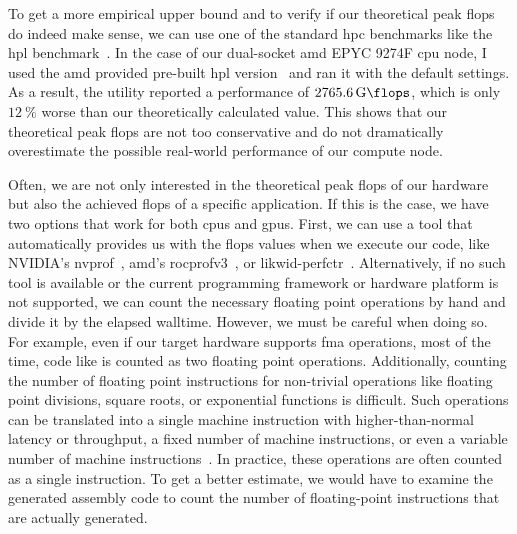 To get a more empirical upper bound and to verify if our theoretical peak \gls{flops} do indeed make sense, we can use one of the standard \gls{hpc} benchmarks like the \gls{hpl} benchmark~\cite{petitet_hpl_2018}. 
In the case of our dual-socket \gls{amd} EPYC 9274F \gls{cpu} node, I used the \gls{amd} provided pre-built \gls{hpl} version~\cite{amd_pre-built_2025} and ran it with the default settings. 
As a result, the utility reported a performance of $\SI{2765.6}{\giga\flops}$, which is only $\SI{12}{\percent}$ worse than our theoretically calculated value. 
This shows that our theoretical peak \gls{flops} are not too conservative and do not dramatically overestimate the possible real-world performance of our compute node. 

Often, we are not only interested in the theoretical peak \gls{flops} of our hardware but also the achieved \gls{flops} of a specific application.
If this is the case, we have two options that work for both \glspl{cpu} and \glspl{gpu}. 
First, we can use a tool that automatically provides us with the \gls{flops} values when we execute our code, like NVIDIA's nvprof~\cite{nvidia_corporation_cuda_2025}, \gls{amd}'s rocprofv3~\cite{amd_using_2024}, or likwid-perfctr~\cite{thomas_gruber_likwid_2023}. 
Alternatively, if no such tool is available or the current programming framework or hardware platform is not supported, we can count the necessary floating point operations by hand and divide it by the elapsed walltime. 
However, we must be careful when doing so. 
For example, even if our target hardware supports \gls{fma} operations, most of the time, code like  is counted as two floating point operations. 
Additionally, counting the number of floating point instructions for non-trivial operations like floating point divisions, square roots, or exponential functions is difficult. 
Such operations can be translated into a single machine instruction with higher-than-normal latency or throughput, a fixed number of machine instructions, or even a variable number of machine instructions~\cite{dolbeau_theoretical_2018}. 
In practice, these operations are often counted as a single instruction. 
To get a better estimate, we would have to examine the generated assembly code to count the number of floating-point instructions that are actually generated. 

